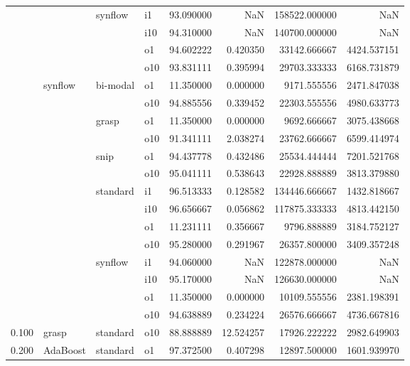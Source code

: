 \begin{longtable}{llllrrrr}
      &     & synflow & i1 &  93.090000 &        NaN &    158522.000000 &           NaN \\
      &     &         & i10 &  94.310000 &        NaN &    140700.000000 &           NaN \\
      &     &         & o1 &  94.602222 &   0.420350 &     33142.666667 &   4424.537151 \\
      &     &         & o10 &  93.831111 &   0.395994 &     29703.333333 &   6168.731879 \\
      & synflow & bi-modal & o1 &  11.350000 &   0.000000 &      9171.555556 &   2471.847038 \\
      &     &         & o10 &  94.885556 &   0.339452 &     22303.555556 &   4980.633773 \\
      &     & grasp & o1 &  11.350000 &   0.000000 &      9692.666667 &   3075.438668 \\
      &     &         & o10 &  91.341111 &   2.038274 &     23762.666667 &   6599.414974 \\
      &     & snip & o1 &  94.437778 &   0.432486 &     25534.444444 &   7201.521768 \\
      &     &         & o10 &  95.041111 &   0.538643 &     22928.888889 &   3813.379880 \\
      &     & standard & i1 &  96.513333 &   0.128582 &    134446.666667 &   1432.818667 \\
      &     &         & i10 &  96.656667 &   0.056862 &    117875.333333 &   4813.442150 \\
      &     &         & o1 &  11.231111 &   0.356667 &      9796.888889 &   3184.752127 \\
      &     &         & o10 &  95.280000 &   0.291967 &     26357.800000 &   3409.357248 \\
      &     & synflow & i1 &  94.060000 &        NaN &    122878.000000 &           NaN \\
      &     &         & i10 &  95.170000 &        NaN &    126630.000000 &           NaN \\
      &     &         & o1 &  11.350000 &   0.000000 &     10109.555556 &   2381.198391 \\
      &     &         & o10 &  94.638889 &   0.234224 &     26576.666667 &   4736.667816 \\
0.100 & grasp & standard & o10 &  88.888889 &  12.524257 &     17926.222222 &   2982.649903 \\
0.200 & AdaBoost & standard & o1 &  97.372500 &   0.407298 &     12897.500000 &   1601.939970 \\

\end{longtable}
